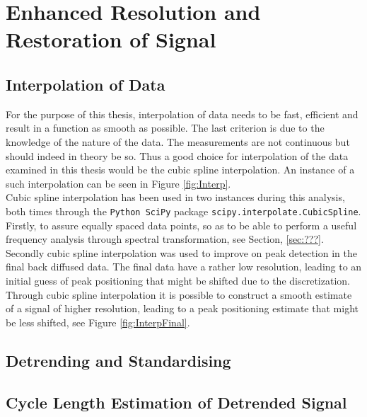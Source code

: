 \documentclass[../../CompleteThesis/Complete_1stDraft]{subfiles}
\begin{document}
\section[Restoration][Restoration]{Enhanced Resolution and Restoration of Signal}
\label{Sec:SignalAnalysis_Restoration}

\subsection[Interpolation]{Interpolation of Data}
\label{Subsec:SignalAnalysis_Restoration_Interpolation}
For the purpose of this thesis, interpolation of data needs to be fast, efficient and result in a function as smooth as possible. The last criterion is due to the knowledge of the nature of the data. The measurements are not continuous but should indeed in theory be so. Thus a good choice for interpolation of the data examined in this thesis would be the cubic spline interpolation. An instance of a such interpolation can be seen in Figure \ref{fig:Interp}.\\
Cubic spline interpolation has been used in two instances during this analysis, both times through the \lstinline[language=Python]|Python SciPy| package \lstinline[language=Python]|scipy.interpolate.CubicSpline|. Firstly, to assure equally spaced data points, so as to be able to perform a useful frequency analysis through spectral transformation, see Section, \ref{sec:???}. Secondly cubic spline interpolation was used to improve on peak detection in the final back diffused data. The final data have a rather low resolution, leading to an initial guess of peak positioning that might be shifted due to the discretization. Through cubic spline interpolation it is possible to construct a smooth estimate of a signal of higher resolution, leading to a peak positioning estimate that might be less shifted, see Figure \ref{fig:InterpFinal}.

\subsection[Standardisation]{Detrending and Standardising}
\label{Subsec:SignalAnalysis_Restoration_Standardisation}

\subsection[Cycle Length Estimation][Cycle Length Estimation]{Cycle Length Estimation of Detrended Signal}
\label{Subsec:SignalAnalysis_Restoration_CycleLengthEst}
	
\end{document}
